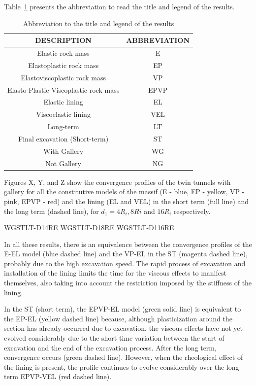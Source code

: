 \documentclass[a4paper,fleqn]{cas-sc}
\begin{document}
Table~\ref{table3} presents the abbreviation to read the title and legend of the results.

\begin{table}
	\caption{Abbreviation to the title and legend of the results}
	\label{table3}
	\centering
	\renewcommand{\arraystretch}{1.25}
	\begin{tabular}{c c}
		\hline
		\multicolumn{1}{c}{DESCRIPTION} &
		\multicolumn{1}{c}{ABBREVIATION} \\
		\hline
		Elastic rock mass & E \\
		Elastoplastic rock mass & EP \\
		Elastoviscoplastic rock mass & VP \\
		Elasto-Plastic-Viscoplastic rock mass & EPVP \\
		Elastic lining & EL \\
		Viscoelastic lining & VEL \\
		Long-term & LT \\
		Final excavation (Short-term) & ST \\
		With Gallery & WG \\
		Not Gallery & NG \\			
		\hline
	\end{tabular}
	\normalsize
\end{table}
\FloatBarrier

Figures X, Y, and Z show the convergence profiles of the twin tunnels with gallery for all the constitutive models of the massif (E - blue, EP - yellow, VP - pink, EPVP - red) and the lining (EL and VEL) in the short term (full line) and the long term (dashed line), for $d_1 = 4R_i, 8Ri$ and $16R_i$ respectively.

WGSTLT-D14RE
WGSTLT-D18RE
WGSTLT-D116RE

In all these results, there is an equivalence between the convergence profiles of the E-EL model (blue dashed line) and the VP-EL in the ST (magenta dashed line), probably due to the high excavation speed. The rapid process of excavation and installation of the lining limits the time for the viscous effects to manifest themselves, also taking into account the restriction imposed by the stiffness of the lining.

In the ST (short term), the EPVP-EL model (green solid line) is equivalent to the EP-EL (yellow dashed line) because, although plasticization around the section has already occurred due to excavation, the viscous effects have not yet evolved considerably due to the short time variation between the start of excavation and the end of the excavation process. After the long term, convergence occurs (green dashed line). However, when the rheological effect of the lining is present, the profile continues to evolve considerably over the long term EPVP-VEL (red dashed line).
\end{document}
